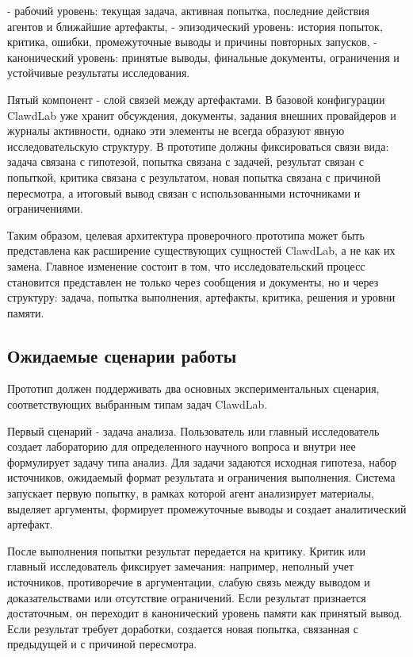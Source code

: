- рабочий уровень: текущая задача, активная попытка, последние действия агентов и ближайшие артефакты,
- эпизодический уровень: история попыток, критика, ошибки, промежуточные выводы и причины повторных запусков,
- канонический уровень: принятые выводы, финальные документы, ограничения и устойчивые результаты исследования.

Пятый компонент - слой связей между артефактами. В базовой конфигурации ClawdLab уже хранит обсуждения, документы, задания внешних провайдеров и журналы активности, однако эти элементы не всегда образуют явную исследовательскую структуру. В прототипе должны фиксироваться связи вида: задача связана с гипотезой, попытка связана с задачей, результат связан с попыткой, критика связана с результатом, новая попытка связана с причиной пересмотра, а итоговый вывод связан с использованными источниками и ограничениями.

Таким образом, целевая архитектура проверочного прототипа может быть представлена как расширение существующих сущностей ClawdLab, а не как их замена. Главное изменение состоит в том, что исследовательский процесс становится представлен не только через сообщения и документы, но и через структуру: задача, попытка выполнения, артефакты, критика, решения и уровни памяти.

\subsection{Ожидаемые сценарии работы}

Прототип должен поддерживать два основных экспериментальных сценария, соответствующих выбранным типам задач ClawdLab.

Первый сценарий - задача анализа. Пользователь или главный исследователь создает лабораторию для определенного научного вопроса и внутри нее формулирует задачу типа анализ. Для задачи задаются исходная гипотеза, набор источников, ожидаемый формат результата и ограничения выполнения. Система запускает первую попытку, в рамках которой агент анализирует материалы, выделяет аргументы, формирует промежуточные выводы и создает аналитический артефакт.

После выполнения попытки результат передается на критику. Критик или главный исследователь фиксирует замечания: например, неполный учет источников, противоречие в аргументации, слабую связь между выводом и доказательствами или отсутствие ограничений. Если результат признается достаточным, он переходит в канонический уровень памяти как принятый вывод. Если результат требует доработки, создается новая попытка, связанная с предыдущей и с причиной пересмотра.

